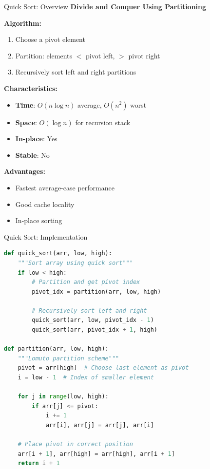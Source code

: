 \documentclass[aspectratio=169]{beamer}
\begin{document}
\begin{frame}{Quick Sort: Overview}
  \textbf{Divide and Conquer Using Partitioning}

  \vspace{0.3cm}
  \textbf{Algorithm:}
  \begin{enumerate}
    \item Choose a pivot element
    \item Partition: elements $<$ pivot left, $>$ pivot right
    \item Recursively sort left and right partitions
  \end{enumerate}

  \vspace{0.3cm}
  \textbf{Characteristics:}
  \begin{itemize}
    \item \textbf{Time}: $O(n \log n)$ average, $O(n^2)$ worst
    \item \textbf{Space}: $O(\log n)$ for recursion stack
    \item \textbf{In-place}: Yes
    \item \textbf{Stable}: No
  \end{itemize}

  \vspace{0.3cm}
  \textbf{Advantages:}
  \begin{itemize}
    \item Fastest average-case performance
    \item Good cache locality
    \item In-place sorting
  \end{itemize}
\end{frame}

\begin{frame}[fragile]{Quick Sort: Implementation}
\begin{lstlisting}[language=Python, basicstyle=\ttfamily\tiny]
def quick_sort(arr, low, high):
    """Sort array using quick sort"""
    if low < high:
        # Partition and get pivot index
        pivot_idx = partition(arr, low, high)

        # Recursively sort left and right
        quick_sort(arr, low, pivot_idx - 1)
        quick_sort(arr, pivot_idx + 1, high)

def partition(arr, low, high):
    """Lomuto partition scheme"""
    pivot = arr[high]  # Choose last element as pivot
    i = low - 1  # Index of smaller element

    for j in range(low, high):
        if arr[j] <= pivot:
            i += 1
            arr[i], arr[j] = arr[j], arr[i]

    # Place pivot in correct position
    arr[i + 1], arr[high] = arr[high], arr[i + 1]
    return i + 1
\end{lstlisting}
\end{frame}
\end{document}
